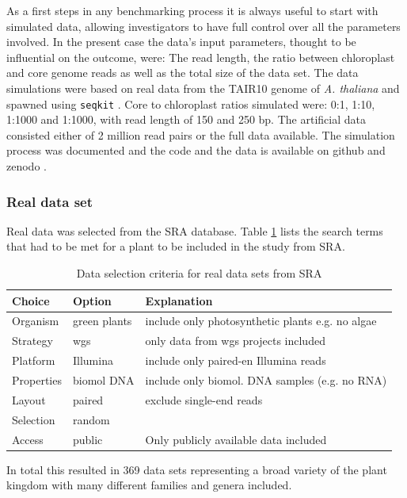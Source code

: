 As a first steps in any benchmarking process it is always useful to start with simulated data, allowing
investigators to have full control over all the parameters involved. In the present case the data's input
parameters, thought to be influential on the outcome, were: The read length, the ratio between chloroplast and
core genome reads as well as the total size of the data set. The data simulations were based on real data from
the TAIR10 genome of \textit{A. thaliana} \cite{tair10} and spawned using \texttt{seqkit} \cite{seqkit}. Core
to chloroplast ratios simulated were: 0:1, 1:10, 1:1000 and 1:1000, with read length of 150 and 250 bp. The
artificial data consisted either of 2 million read pairs or the full data available. The simulation process
was documented and the code and the data is available on github and zenodo \cite{zenododataset}.

\subsubsection{Real data set}\label{sec:cp_real}

Real data was selected from the SRA database. Table \ref{tab:sra_real} lists the search terms that had to be
met for a plant to be included in the study from SRA.

\onehalfspacing
\begin{table}[H]
\caption{Data selection criteria for real data sets from SRA}
\label{tab:sra_real}
\centering
\begin{tabular}{lll}
  \hline
  Choice & Option & Explanation \\
  \hline
   Organism   & green plants &  include only photosynthetic plants e.g. no algae  \\
   Strategy   & wgs          & only data from wgs projects included \\
   Platform   & Illumina     & include only paired-en Illumina reads \\
   Properties & biomol DNA   & include only biomol. DNA samples (e.g. no RNA) \\
   Layout     & paired       & exclude single-end reads  \\
   Selection  & random       & \\
   Access     & public       & Only publicly available data included \\
  \hline                                         
\end{tabular}
\end{table}
\doublespacing
\noindent
In total this resulted in 369 data sets representing a broad variety of the plant kingdom with many different
families and genera included.

